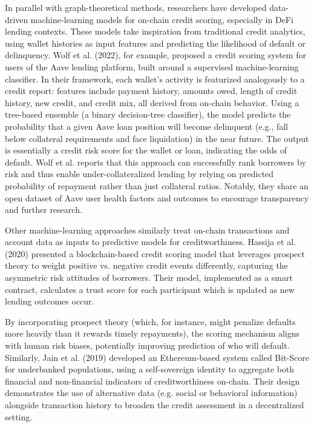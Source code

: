 In parallel with graph-theoretical methods, researchers have developed data-driven machine-learning models for on-chain credit scoring, especially in DeFi lending contexts. These models take inspiration from traditional credit analytics, using wallet histories as input features and predicting the likelihood of default or delinquency. Wolf et al. (2022), for example, proposed a credit scoring system for users of the Aave lending platform, built around a supervised machine-learning classifier. In their framework, each wallet's activity is featurized analogously to a credit report: features include payment history, amounts owed, length of credit history, new credit, and credit mix, all derived from on-chain behavior. Using a tree-based ensemble (a binary decision-tree classifier), the model predicts the probability that a given Aave loan position will become delinquent (e.g., fall below collateral requirements and face liquidation) in the near future. The output is essentially a credit risk score for the wallet or loan, indicating the odds of default. Wolf et al. reports that this approach can successfully rank borrowers by risk and thus enable under-collateralized lending by relying on predicted probability of repayment rather than just collateral ratios. Notably, they share an open dataset of Aave user health factors and outcomes to encourage transparency and further research.


Other machine-learning approaches similarly treat on-chain transactions and account data as inputs to predictive models for creditworthiness. Hassija et al. (2020) presented a blockchain-based credit scoring model that leverages prospect theory to weight positive vs. negative credit events differently, capturing the asymmetric risk attitudes of borrowers. Their model, implemented as a smart contract, calculates a trust score for each participant which is updated as new lending outcomes occur.


By incorporating prospect theory (which, for instance, might penalize defaults more heavily than it rewards timely repayments), the scoring mechanism aligns with human risk biases, potentially improving prediction of who will default. Similarly, Jain et al. (2019) developed an Ethereum-based system called Bit-Score for underbanked populations, using a self-sovereign identity to aggregate both financial and non-financial indicators of creditworthiness on-chain. Their design demonstrates the use of alternative data (e.g. social or behavioral information) alongside transaction history to broaden the credit assessment in a decentralized setting.


